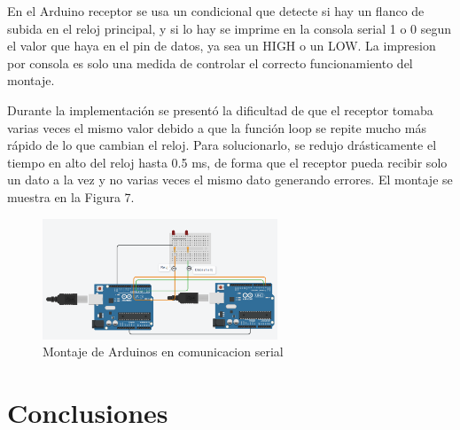 \documentclass{article}
\begin{document}
En el Arduino receptor se usa un condicional que detecte si hay un flanco de subida en el reloj principal, y si lo hay se imprime en la consola serial 1 o 0 segun el valor que haya en el pin de datos, ya sea un HIGH o un LOW. La impresion por consola es solo una medida de controlar el correcto funcionamiento del montaje.

Durante la implementación se presentó la dificultad de que el receptor tomaba varias veces el mismo valor debido a que la función loop se repite mucho más rápido de lo que cambian el reloj. Para solucionarlo, se redujo drásticamente el tiempo en alto del reloj hasta 0.5 ms, de forma que el receptor pueda recibir solo un dato a la vez y no varias veces el mismo dato generando errores. El montaje se muestra en la Figura 7.

\begin{figure}[!ht] 
\includegraphics[width=7cm]{montajeSerial.PNG}
\centering
\caption{Montaje de Arduinos en comunicacion serial}
\end{figure}



\section{Conclusiones} \label{conclusiones}




\end{document}
